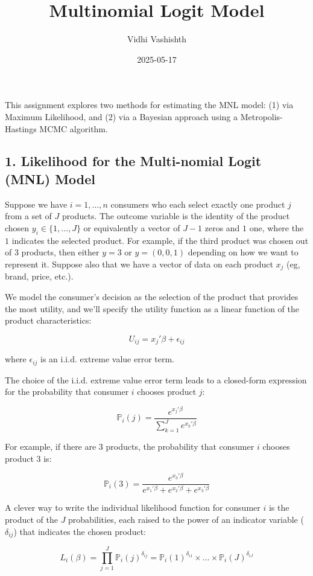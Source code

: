 \documentclass[
  letterpaper,
  DIV=11,
  numbers=noendperiod]{scrartcl}
\title{Multinomial Logit Model}
\author{Vidhi Vashishth}
\date{2025-05-17}
\begin{document}
\maketitle


This assignment explores two methods for estimating the MNL model: (1)
via Maximum Likelihood, and (2) via a Bayesian approach using a
Metropolis-Hastings MCMC algorithm.

\subsection{1. Likelihood for the Multi-nomial Logit (MNL)
Model}\label{likelihood-for-the-multi-nomial-logit-mnl-model}

Suppose we have \(i=1,\ldots,n\) consumers who each select exactly one
product \(j\) from a set of \(J\) products. The outcome variable is the
identity of the product chosen \(y_i \in \{1, \ldots, J\}\) or
equivalently a vector of \(J-1\) zeros and \(1\) one, where the \(1\)
indicates the selected product. For example, if the third product was
chosen out of 3 products, then either \(y=3\) or \(y=(0,0,1)\) depending
on how we want to represent it. Suppose also that we have a vector of
data on each product \(x_j\) (eg, brand, price, etc.).

We model the consumer's decision as the selection of the product that
provides the most utility, and we'll specify the utility function as a
linear function of the product characteristics:

\[ U_{ij} = x_j'\beta + \epsilon_{ij} \]

where \(\epsilon_{ij}\) is an i.i.d. extreme value error term.

The choice of the i.i.d. extreme value error term leads to a closed-form
expression for the probability that consumer \(i\) chooses product
\(j\):

\[ \mathbb{P}_i(j) = \frac{e^{x_j'\beta}}{\sum_{k=1}^Je^{x_k'\beta}} \]

For example, if there are 3 products, the probability that consumer
\(i\) chooses product 3 is:

\[ \mathbb{P}_i(3) = \frac{e^{x_3'\beta}}{e^{x_1'\beta} + e^{x_2'\beta} + e^{x_3'\beta}} \]

A clever way to write the individual likelihood function for consumer
\(i\) is the product of the \(J\) probabilities, each raised to the
power of an indicator variable (\(\delta_{ij}\)) that indicates the
chosen product:

\[ L_i(\beta) = \prod_{j=1}^J \mathbb{P}_i(j)^{\delta_{ij}} = \mathbb{P}_i(1)^{\delta_{i1}} \times \ldots \times \mathbb{P}_i(J)^{\delta_{iJ}}\]
\end{document}
